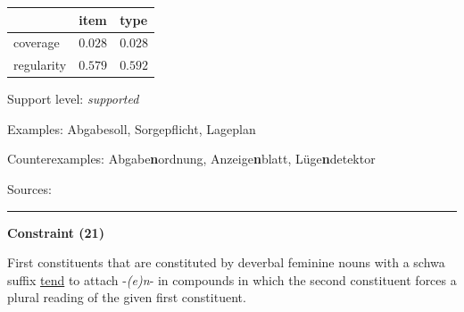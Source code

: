 \vspace{-0.35em}

\begin{table}[!ht]
\begin{center}

\begin{tabularx}{\columnwidth}{|X|X|X|}
\hline
 & item & type \\
\hline
 coverage & $0.028$ & $0.028$ \\
\hline
 regularity & $0.579$ & $0.592$ \\
\hline
\end{tabularx}
\end{center}
\end{table}

\vspace{-1.35em}

\noindent
Support level: \textit{supported}

\vspace{0.3em}

\noindent
Examples: Abgabe{\zeroLinker}soll, Sorge{\zeroLinker}pflicht, Lage{\zeroLinker}plan

\noindent
Counterexamples: Abgabe\textbf{n}ordnung, Anzeige\textbf{n}blatt, Lüge\textbf{n}detektor

\vspace{0.3em}

\noindent
Sources: \citet[93]{ortner_mueller-bollhagen_1991}


\hrule



\newpage

\vspace{0.4em}

\begin{center}
\textbf{Constraint (21)}
\end{center}

\noindent
First constituents that are constituted by deverbal feminine nouns with a schwa suffix \underline{tend} to attach \mbox{-\textit{(e)n}-} in compounds in which the second constituent forces a plural reading of the given first constituent.
\vspace{0.35em}


